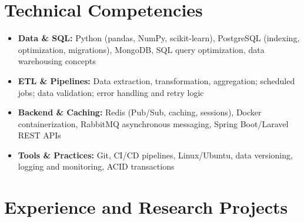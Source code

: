 \documentclass[a4paper,11pt]{article}
\begin{document}
\vspace{4pt}

\section{Technical Competencies}
\begin{itemize}[leftmargin=*, nosep]
    \item \small{\textbf{Data \& SQL:} Python (pandas, NumPy, scikit-learn), PostgreSQL (indexing, optimization, migrations), MongoDB, SQL query optimization, data warehousing concepts}
    \item \small{\textbf{ETL \& Pipelines:} Data extraction, transformation, aggregation; scheduled jobs; data validation; error handling and retry logic}
    \item \small{\textbf{Backend \& Caching:} Redis (Pub/Sub, caching, sessions), Docker containerization, RabbitMQ asynchronous messaging, Spring Boot/Laravel REST APIs}
    \item \small{\textbf{Tools \& Practices:} Git, CI/CD pipelines, Linux/Ubuntu, data versioning, logging and monitoring, ACID transactions}
\end{itemize}

\vspace{4pt}

\section{Experience and Research Projects}
\end{document}
